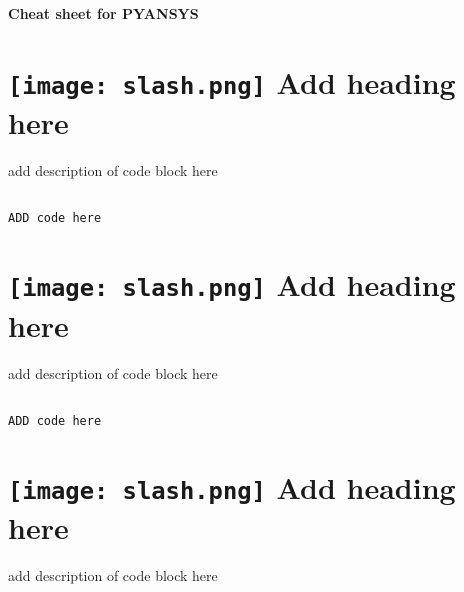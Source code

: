 \documentclass[9pt,landscape]{article}
\begin{document}
\raggedright
\footnotesize


\begin{center}
     \Huge{\textbf{Cheat sheet for PYANSYS}} \\
\end{center}
\vspace{-0.15cm}
\noindent\makebox[\linewidth]{\rule{\paperwidth}{2pt}}

\begin{multicols}{3}
\setlength{\premulticols}{1pt}
\setlength{\postmulticols}{1pt}
\setlength{\multicolsep}{1pt}
\setlength{\columnsep}{2pt}


\section{\texttt{[image: slash.png]} Add heading here}
add description of code block here
\begin{lstlisting}[language=Python]

ADD code here

\end{lstlisting}


\vfill
\section{\texttt{[image: slash.png]}  Add heading here}
add description of code block here
\begin{lstlisting}[language=Python]

ADD code here

\end{lstlisting} 

\vfill
\section{\texttt{[image: slash.png]}  Add heading here}
add description of code block here
\begin{lstlisting}[language=Python]


\end{lstlisting}
\end{multicols}
\end{document}
